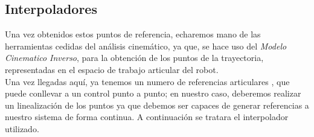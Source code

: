 \subsection{Interpoladores}
Una vez obtenidos estos puntos de referencia, echaremos mano de las herramientas cedidas del análisis cinemático, ya que, se hace uso
del \textit{Modelo Cinematico Inverso}, para la obtención de los puntos de la trayectoria, representadas en el espacio de trabajo
articular del robot.\\


Una vez llegadas aquí, ya tenemos un numero de referencias articulares , que puede conllevar a un control punto a punto; 
en nuestro caso, deberemos realizar un linealización de los puntos ya que debemos ser capaces de generar referencias a nuestro sistema 
de forma continua. A continuación se tratara el interpolador utilizado.

